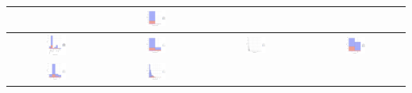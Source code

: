 \begin{table}
\begin{center}
\begin{tabular}{ |c|c|c|c| }
			& \includegraphics[width=0.22\textwidth]{NOTEBOOK/IMAGENES_BIRCH_DESCRIPTIVAS/24} 
			\\  \hline 
			\includegraphics[width=0.22\textwidth]{NOTEBOOK/IMAGENES_BIRCH_DESCRIPTIVAS/25} 
			& \includegraphics[width=0.22\textwidth]{NOTEBOOK/IMAGENES_BIRCH_DESCRIPTIVAS/26} 
			& \includegraphics[width=0.22\textwidth]{NOTEBOOK/IMAGENES_BIRCH_DESCRIPTIVAS/27} 
			& \includegraphics[width=0.22\textwidth]{NOTEBOOK/IMAGENES_BIRCH_DESCRIPTIVAS/28}
			\\  \hline 
			\includegraphics[width=0.22\textwidth]{NOTEBOOK/IMAGENES_BIRCH_DESCRIPTIVAS/29} 
			& \includegraphics[width=0.22\textwidth]{NOTEBOOK/IMAGENES_BIRCH_DESCRIPTIVAS/30} 

\end{tabular}
\end{center}
\end{table}

